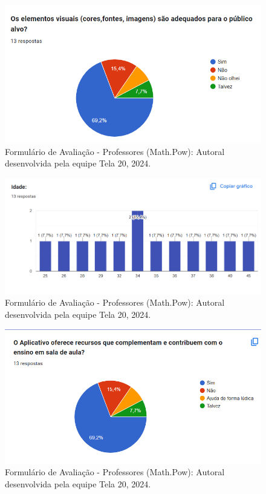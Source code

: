 \documentclass[12pt, openany, oneside, a4paper, english, brazil]{abntex2}   %
\begin{document}
\begin{figure}
    \centering
    \includegraphics{figuras/Formulário Gráficos/Professores/5 Elementos visuais.png}
    \caption{Formulário de Avaliação - Professores (Math.Pow):  Autoral desenvolvida pela equipe Tela 20, 2024.}
    \label{gráfico gerado pelo formulário}
\end{figure}

\begin{figure}
    \centering
    \includegraphics[width=0.9\linewidth]{figuras/Formulário Gráficos/Professores/6 idade.png}
    \caption{Formulário de Avaliação - Professores (Math.Pow):  Autoral desenvolvida pela equipe Tela 20, 2024.}
    \label{gráfico gerado pelo formulário}
\end{figure}

\begin{figure}
    \centering
    \includegraphics{figuras/Formulário Gráficos/Professores/7 O aplicativo oferece recursos que complementem.png}
    \caption{Formulário de Avaliação - Professores (Math.Pow):  Autoral desenvolvida pela equipe Tela 20, 2024.}
    \label{gráfico gerado pelo formulário}
\end{figure}
\end{document}
